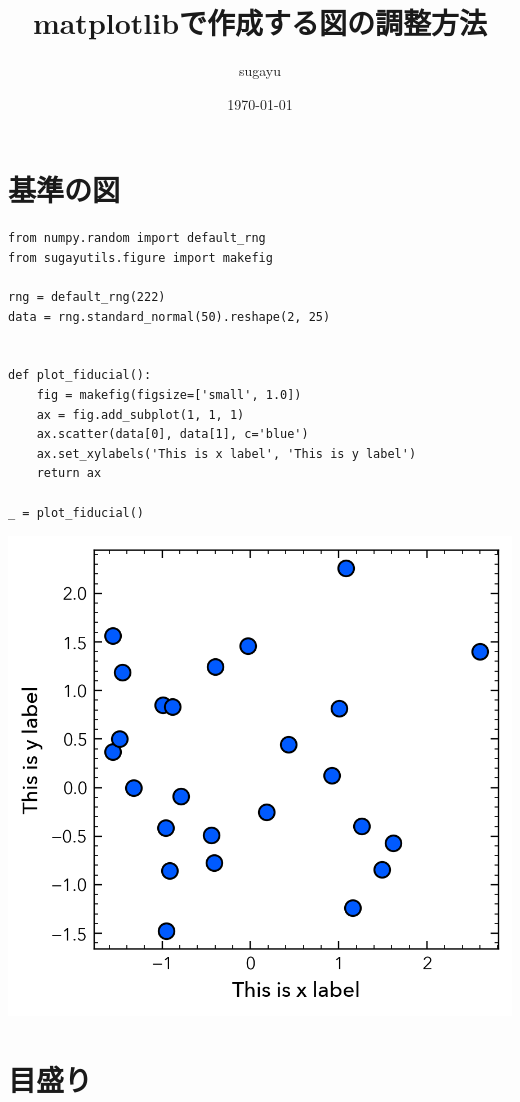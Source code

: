 \documentclass[a4paper, 10pt, notitlepage, twocolumn, uplatex, oneside, dvipdfmx]{jsarticle}
\author{sugayu}
\date{\today}
\title{\textbf{matplotlibで作成する図の調整方法}}
\begin{document}
\maketitle
\tableofcontents

\section{基準の図}
\label{sec:orgfe9c605}
\begin{verbatim}
from numpy.random import default_rng
from sugayutils.figure import makefig

rng = default_rng(222)
data = rng.standard_normal(50).reshape(2, 25)


def plot_fiducial():
    fig = makefig(figsize=['small', 1.0])
    ax = fig.add_subplot(1, 1, 1)
    ax.scatter(data[0], data[1], c='blue')
    ax.set_xylabels('This is x label', 'This is y label')
    return ax

_ = plot_fiducial()
\end{verbatim}

\begin{center}
\includegraphics[width=1.0\linewidth]{./obipy-resources/fiducial.png}
\end{center}
\section{目盛り}
\label{sec:org30c575c}
\end{document}
